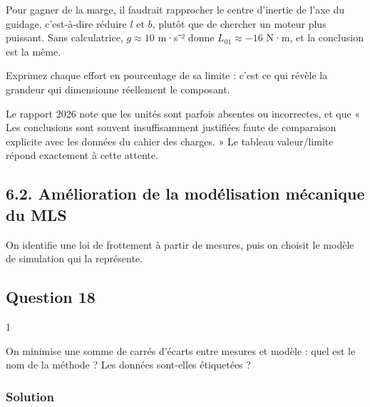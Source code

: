 \documentclass[11pt,a4paper]{article}
\begin{document}
Pour gagner de la marge, il faudrait rapprocher le centre d'inertie de l'axe du guidage, c'est-à-dire réduire \(l\) et \(b\), plutôt que de chercher un moteur plus puissant. Sans calculatrice, \(g\approx10\) m·s⁻² donne \(L_{01}\approx-16\) N·m, et la conclusion est la même.

\begin{methode}

Exprimez chaque effort en pourcentage de sa limite : c'est ce qui révèle la grandeur qui dimensionne réellement le composant.

\end{methode}

\begin{jury}

Le rapport 2026 note que les unités sont parfois absentes ou incorrectes, et que « Les conclusions sont souvent insuffisamment justifiées faute de comparaison explicite avec les données du cahier des charges. » Le tableau valeur/limite répond exactement à cette attente.

\end{jury}

\hypertarget{amuxe9lioration-de-la-moduxe9lisation-muxe9canique-du-mls}{%
\subsection{6.2. Amélioration de la modélisation mécanique du MLS}\label{amuxe9lioration-de-la-moduxe9lisation-muxe9canique-du-mls}}

On identifie une loi de frottement à partir de mesures, puis on choisit le modèle de simulation qui la représente.

\hypertarget{question-18}{%
\subsection{Question 18}\label{question-18}}

\begin{indication}{1}

On minimise une somme de carrés d'écarts entre mesures et modèle : quel est le nom de la méthode ? Les données sont-elles étiquetées ?

\end{indication}

\hypertarget{solution-17}{%
\subsubsection{Solution}\label{solution-17}}
\end{document}
